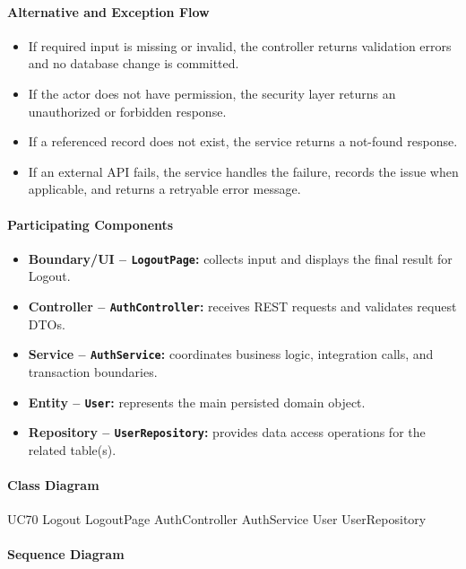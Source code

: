\paragraph{Alternative and Exception Flow}

\begin{itemize}
    \item If required input is missing or invalid, the controller returns validation errors and no database change is committed.
    \item If the actor does not have permission, the security layer returns an unauthorized or forbidden response.
    \item If a referenced record does not exist, the service returns a not-found response.
    \item If an external API fails, the service handles the failure, records the issue when applicable, and returns a retryable error message.
\end{itemize}

\paragraph{Participating Components}

\begin{itemize}
    \item \textbf{Boundary/UI -- \texttt{LogoutPage}:} collects input and displays the final result for Logout.
    \item \textbf{Controller -- \texttt{AuthController}:} receives REST requests and validates request DTOs.
    \item \textbf{Service -- \texttt{AuthService}:} coordinates business logic, integration calls, and transaction boundaries.
    \item \textbf{Entity -- \texttt{User}:} represents the main persisted domain object.
    \item \textbf{Repository -- \texttt{UserRepository}:} provides data access operations for the related table(s).
\end{itemize}

\paragraph{Class Diagram}

\ClassDiagram
{UC70 Logout}
{LogoutPage}
{AuthController}
{AuthService}
{User}
{UserRepository}

\paragraph{Sequence Diagram}

